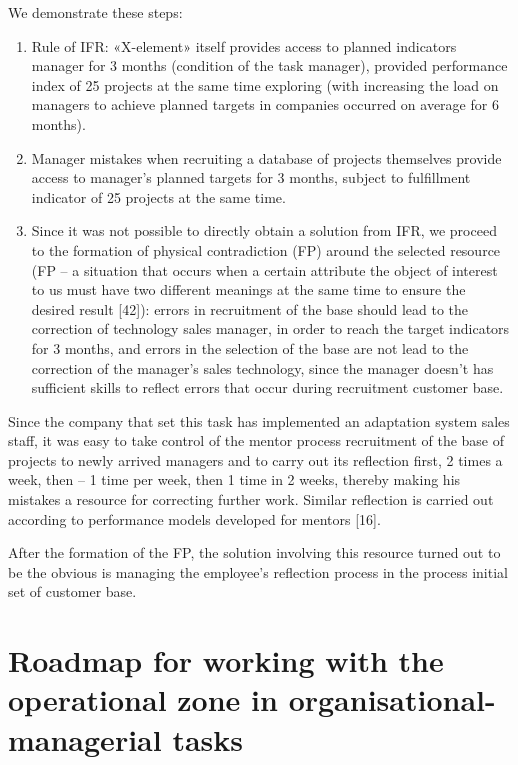 \documentclass[11pt,a4paper]{book}
\begin{document}
We demonstrate these steps:
\begin{enumerate}
\item Rule of IFR: «X-element» itself provides access to planned indicators
  manager for 3 months (condition of the task manager), provided performance
  index of 25 projects at the same time exploring (with increasing the load on
  managers to achieve planned targets in companies occurred on average for 6
  months).
\item Manager mistakes when recruiting a database of projects themselves
  provide access to manager's planned targets for 3 months, subject to
  fulfillment indicator of 25 projects at the same time.
\item Since it was not possible to directly obtain a solution from IFR, we
  proceed to the formation of physical contradiction (FP) around the selected
  resource (FP -- a situation that occurs when a certain attribute the object
  of interest to us must have two different meanings at the same time to
  ensure the desired result [42]): errors in recruitment of the base should
  lead to the correction of technology sales manager, in order to reach the
  target indicators for 3 months, and errors in the selection of the base are
  not lead to the correction of the manager’s sales technology, since the
  manager doesn’t has sufficient skills to reflect errors that occur during
  recruitment customer base.
\end{enumerate}
Since the company that set this task has implemented an adaptation system
sales staff, it was easy to take control of the mentor process recruitment of
the base of projects to newly arrived managers and to carry out its reflection
first, 2 times a week, then -- 1 time per week, then 1 time in 2 weeks,
thereby making his mistakes a resource for correcting further work. Similar
reflection is carried out according to performance models developed for
mentors [16].

After the formation of the FP, the solution involving this resource turned out
to be the obvious is managing the employee’s reflection process in the process
initial set of customer base.

\section[Roadmap]{Roadmap for working with the operational zone in 
  organisational-managerial tasks}
\end{document}
